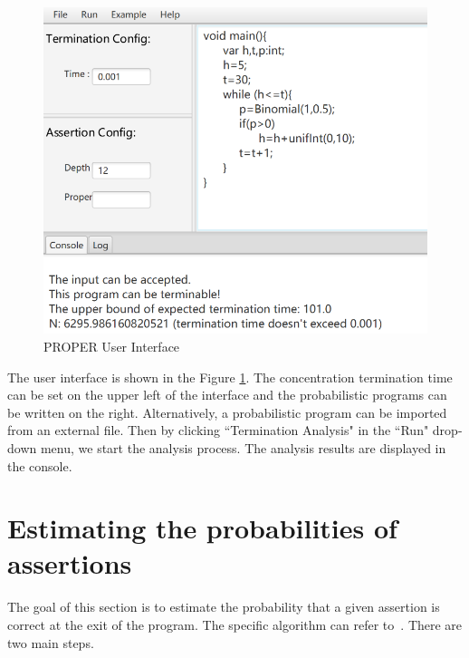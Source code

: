 \documentclass[sigconf,review, anonymous]{acmart}
\begin{document}
\begin{figure}[h]
	\centering
	\includegraphics[scale=0.6]{img/interface}
	\caption{PROPER User Interface}
	\label{interface}
\end{figure}

The user interface is shown in the Figure \ref{interface}. The concentration termination time can be set on the upper left of the interface and the probabilistic programs can be written on the right. Alternatively, a probabilistic program  can be imported from an external file. 
Then by clicking ``Termination Analysis" in the ``Run" drop-down menu, we start the analysis process. The analysis results are displayed in the console. 


\section{Estimating the probabilities of assertions}
The goal of this section is to estimate the probability that a given assertion is correct at the exit of the program. The specific algorithm can refer to~\cite{Sankaranarayanan2013Static}. There are two main steps.
\end{document}
